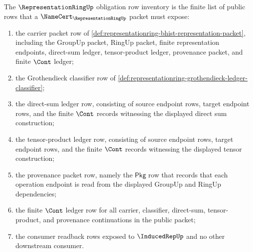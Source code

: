\begin{definition}
\label{def:representationring-obligation-row-inventory}
The $\RepresentationRingUp$ obligation row inventory is the finite list of
public rows that a $\NameCert_{\RepresentationRingUp}$ packet must expose:
\begin{enumerate}
\item the carrier packet row of
\autoref{def:representationring-bhist-representation-packet}, including the
GroupUp packet, RingUp packet, finite representation endpoints, direct-sum
ledger, tensor-product ledger, provenance packet, and finite $\Cont$ ledger;
\item the Grothendieck classifier row of
\autoref{def:representationring-grothendieck-ledger-classifier};
\item the direct-sum ledger row, consisting of source endpoint rows, target
endpoint rows, and the finite $\Cont$ records witnessing the displayed direct
sum construction;
\item the tensor-product ledger row, consisting of source endpoint rows,
target endpoint rows, and the finite $\Cont$ records witnessing the displayed
tensor construction;
\item the provenance packet row, namely the $\mathsf{Pkg}$ row that records
that each operation endpoint is read from the displayed GroupUp and RingUp
dependencies;
\item the finite $\Cont$ ledger row for all carrier, classifier, direct-sum,
tensor-product, and provenance continuations in the public packet;
\item the consumer readback rows exposed to $\InducedRepUp$ and no other
downstream consumer.
\end{enumerate}
\end{definition}

